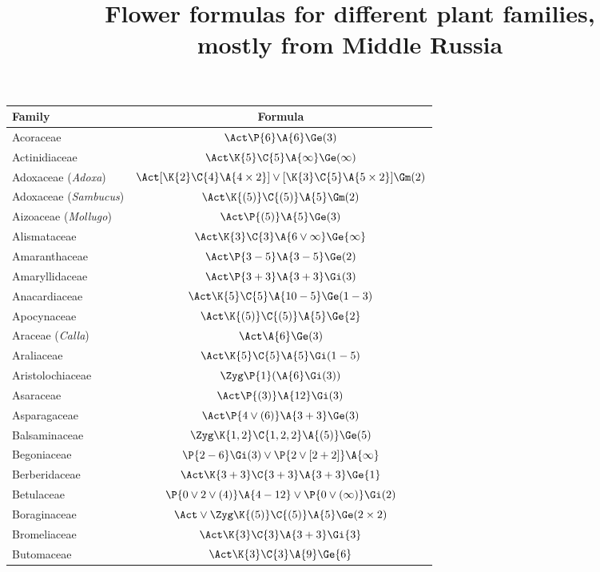 \documentclass[12pt]{article}
\title{Flower formulas for different plant families,\\ mostly from Middle Russia}
\author{}
\date{}
\begin{document}
\maketitle

\begin{longtable}{lc}
\hline\rowcolor{tableheadcolor}\textbf{Family}&\textbf{Formula}\\[2pt]
\endhead
\hline
\endfoot
Acoraceae & $\Act\P{6}\A{6}\Ge(3)$\\[2pt]
Actinidiaceae & $\Act\K{5}\C{5}\A{\infty}\Ge(\infty)$\\[2pt]
Adoxaceae (\textit{Adoxa}) & $\Act[\K{2}\C{4}\A{4\times2}]\vee[\K{3}\C{5}\A{5\times2}]\Gm(2)$\\[2pt]
Adoxaceae (\textit{Sambucus}) & $\Act\K{(5)}\C{(5)}\A{5}\Gm(2)$\\[2pt]
Aizoaceae (\textit{Mollugo}) & $\Act\P{(5)}\A{5}\Ge(3)$\\[2pt]
Alismataceae & $\Act\K{3}\C{3}\A{6\vee\infty}\Ge{\infty}$\\[2pt]
Amaranthaceae & $\Act\P{3-5}\A{3-5}\Ge(2)$\\[2pt]
Amaryllidaceae & $\Act\P{3+3}\A{3+3}\Gi(3)$\\[2pt]
Anacardiaceae & $\Act\K{5}\C{5}\A{10-5}\Ge(1-3)$\\[2pt]
Apocynaceae & $\Act\K{(5)}\C{(5)}\A{5}\Ge{2}$\\[2pt]
Araceae (\textit{Calla}) & $\Act\A{6}\Ge(3)$\\[2pt]
Araliaceae & $\Act\K{5}\C{5}\A{5}\Gi(1-5)$\\[2pt]
Aristolochiaceae & $\Zyg\P{1}(\A{6}\Gi(3))$\\[2pt]
Asaraceae & $\Act\P{(3)}\A{12}\Gi(3)$\\[2pt]
Asparagaceae & $\Act\P{4\vee(6)}\A{3+3}\Ge(3)$\\[2pt]
Balsaminaceae  & $\Zyg\K{1,2}\C{1,2,2}\A{(5)}\Ge(5)$\\[2pt]
Begoniaceae & $\P{2-6}\Gi(3)\vee\P{2\vee[2+2]}\A{\infty}$\\[2pt]
Berberidaceae  & $\Act\K{3+3}\C{3+3}\A{3+3}\Ge{1}$\\[2pt]
Betulaceae & $\P{0\vee2\vee(4)}\A{4-12}\vee\P{0\vee(\infty)}\Gi(2)$\\[2pt]
Boraginaceae & $\Act\vee\Zyg\K{(5)}\C{(5)}\A{5}\Ge(2\times2)$\\[2pt]
Bromeliaceae &  $\Act\K{3}\C{3}\A{3+3}\Gi{3}$\\[2pt]
Butomaceae & $\Act\K{3}\C{3}\A{9}\Ge{6}$\\[2pt]

\end{longtable}
\end{document}
